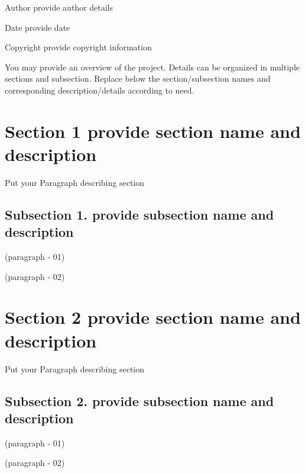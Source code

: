 \begin{DoxyAuthor}{Author}
provide author details 
\end{DoxyAuthor}
\begin{DoxyDate}{Date}
provide date 
\end{DoxyDate}
\begin{DoxyCopyright}{Copyright}
provide copyright information 
\end{DoxyCopyright}
\begin{DoxyParagraph}{You may provide an overview of the project. Details can be organized in multiple sections and subsection.}
Replace below the section/subsection names and corresponding description/details according to need. 
\end{DoxyParagraph}
\hypertarget{index_section_name_1}{}\section{Section 1 provide section name and description}\label{index_section_name_1}
\begin{DoxyParagraph}{Put your Paragraph describing section}
~\newline

\end{DoxyParagraph}
\hypertarget{index_subsection_name_1_1}{}\subsection{Subsection 1. provide subsection name and description}\label{index_subsection_name_1_1}
\begin{DoxyParagraph}{(paragraph -\/ 01)}

\end{DoxyParagraph}
\begin{DoxyParagraph}{(paragraph -\/ 02)}
~\newline
~\newline

\end{DoxyParagraph}
\hypertarget{index_section_name_2}{}\section{Section 2 provide section name and description}\label{index_section_name_2}
\begin{DoxyParagraph}{Put your Paragraph describing section}

\end{DoxyParagraph}
\hypertarget{index_subsection_name_2_1}{}\subsection{Subsection 2. provide subsection name and description}\label{index_subsection_name_2_1}
\begin{DoxyParagraph}{(paragraph -\/ 01)}

\end{DoxyParagraph}
\begin{DoxyParagraph}{(paragraph -\/ 02)}

\end{DoxyParagraph}
\begin{DoxyParagraph}{}

\end{DoxyParagraph}


 